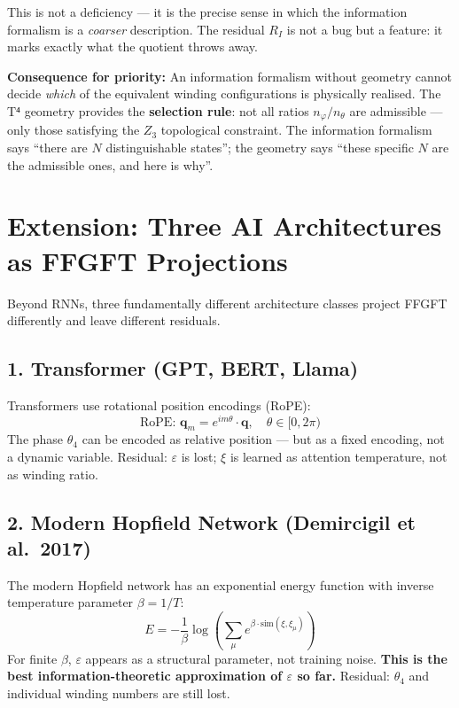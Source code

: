 This is not a deficiency --- it is the precise sense in which the
information formalism is a \emph{coarser} description. The residual
$R_I$ is not a bug but a feature: it marks exactly what the quotient
throws away.

\textbf{Consequence for priority:} An information formalism without
geometry cannot decide \emph{which} of the equivalent winding
configurations is physically realised. The T⁴ geometry provides the
\textbf{selection rule}: not all ratios $n_\varphi/n_\theta$ are
admissible --- only those satisfying the $Z_3$ topological constraint.
The information formalism says ``there are $N$ distinguishable states'';
the geometry says ``these specific $N$ are the admissible ones, and
here is why''.


\section{Extension: Three AI Architectures as FFGFT Projections}

Beyond RNNs, three fundamentally different architecture classes project
FFGFT differently and leave different residuals.

\subsection*{1. Transformer (GPT, BERT, Llama)}

Transformers use rotational position encodings (RoPE):
\begin{equation}
  \text{RoPE: } \mathbf{q}_m = e^{im\theta} \cdot \mathbf{q},
  \quad \theta \in [0, 2\pi)
  \tag{243.12}
\end{equation}
The phase $\theta_4$ can be encoded as relative position --- but as a fixed
encoding, not a dynamic variable. Residual: $\varepsilon$ is lost; $\xi$
is learned as attention temperature, not as winding ratio.

\subsection*{2. Modern Hopfield Network (Demircigil et al.\ 2017)}

The modern Hopfield network has an exponential energy function with
inverse temperature parameter $\beta = 1/T$:
\begin{equation}
  E = -\frac{1}{\beta}\log\!\left(\sum_\mu e^{\beta\cdot\text{sim}(\xi,\xi_\mu)}\right)
  \tag{243.13}
\end{equation}
For finite $\beta$, $\varepsilon$ appears as a structural parameter, not
training noise. \textbf{This is the best information-theoretic approximation
of $\varepsilon$ so far.} Residual: $\theta_4$ and individual winding numbers
are still lost.

